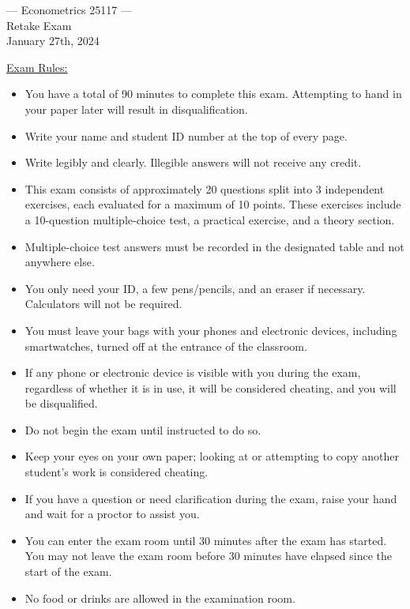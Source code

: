 \documentclass{article}
\begin{document}
\begin{center}
{\Large --- Econometrics 25117 --- \\[1em] Retake Exam \\[1em] \small{January 27th, 2024}}\bigskip 
\end{center}
\vspace{1cm}
\underline{Exam Rules:}
\begin{itemize}
    \item You have a total of 90 minutes to complete this exam. Attempting to hand in your paper later will result in disqualification.
    \item Write your name and student ID number at the top of every page.
    \item Write legibly and clearly. Illegible answers will not receive any credit.
    \item This exam consists of approximately 20 questions split into 3 independent exercises, each evaluated for a maximum of 10 points. These exercises include a 10-question multiple-choice test, a practical exercise, and a theory section.
    \item Multiple-choice test answers must be recorded in the designated table and not anywhere else.
    \item You only need your ID, a few pens/pencils, and an eraser if necessary. Calculators will not be required.
    \item You must leave your bags with your phones and electronic devices, including smartwatches, turned off at the entrance of the classroom.
    \item If any phone or electronic device is visible with you during the exam, regardless of whether it is in use, it will be considered cheating, and you will be disqualified.
    \item Do not begin the exam until instructed to do so.
    \item Keep your eyes on your own paper; looking at or attempting to copy another student's work is considered cheating.
    \item If you have a question or need clarification during the exam, raise your hand and wait for a proctor to assist you.
    \item You can enter the exam room until 30 minutes after the exam has started. You may not leave the exam room before 30 minutes have elapsed since the start of the exam.
    \item No food or drinks are allowed in the examination room.
\end{itemize}
\end{document}
